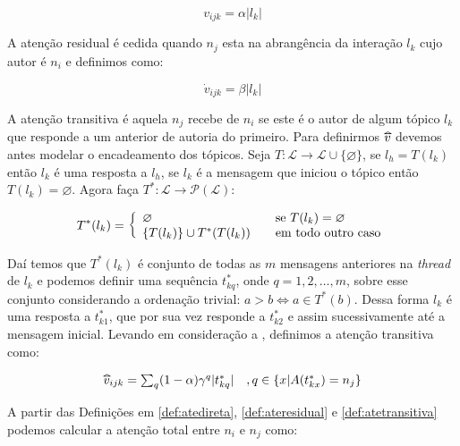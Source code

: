\begin{equation}
\label{def:atedireta}
v_{ijk} = \alpha |l_k| 
\end{equation}

A atenção residual é cedida quando $n_j$ esta na abrangência da interação $l_k$
cujo autor é $n_i$ e definimos como:

\begin{equation}
\label{def:ateresidual}
\dot{v}_{ijk} = \beta |l_k|
\end{equation}

A atenção transitiva é aquela $n_j$ recebe de $n_i$ se este é o autor de algum
tópico $l_k$ que responde a um anterior de autoria do primeiro. Para definirmos
$\widetriangle{v}$ devemos antes modelar o encadeamento dos tópicos. Seja
$T:\mathscr{L}\to \mathscr{L}\cup\{\varnothing\}$, se $l_h=T(l_k)$ então
$l_k$ é uma resposta a $l_h$, se $l_k$ é a mensagem que iniciou o tópico então
$T(l_k)=\varnothing$. Agora faça $T^*:\mathscr{L}\to\mathscr{P}(\mathscr{L})$:

\begin{equation}
\label{def:thread}
T^*(l_k) = \left\{ \begin{array}{l l} \varnothing &\quad\text{se
$T(l_k)=\varnothing$}\\ \{T(l_k)\} \cup T^*(T(l_k)) &\quad\text{em todo outro
caso}\end{array} \right.
\end{equation}

Daí temos que $T^*(l_k)$ é conjunto de todas as $m$ mensagens anteriores na
\emph{thread} de $l_k$ e podemos definir uma sequência $t^*_{kq}$, onde
$q=1,2,\ldots,m$, sobre esse conjunto considerando a ordenação trivial: $a > b
\iff a\in T^*(b)$. Dessa forma $l_k$ é uma resposta a $t^*_{k1}$, que por sua
vez responde a $t^*_{k2}$ e assim sucessivamente até a mensagem inicial. Levando em
consideração a , definimos a atenção transitiva como:

\begin{equation}
\label{def:atetransitiva}
\begin{array}{ l l }
\widetriangle{v}_{ijk} = \sum_{q}(1-\alpha)\gamma^q|t^*_{kq}| 
&, q \in \{x | A(t^*_{kx}) = n_j\}
\end{array}
\end{equation}

A partir das Definições em \ref{def:atedireta}, \ref{def:ateresidual} e
\ref{def:atetransitiva} podemos calcular a atenção total entre $n_i$ e $n_j$
como:

